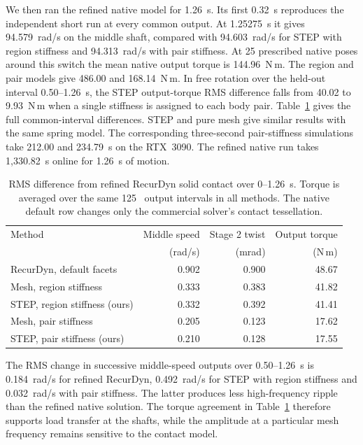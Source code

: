 We then ran the refined native model for 1.26~s. Its first 0.32~s reproduces the independent short run at every common output. At 1.25275~s it gives 94.579~rad/s on the middle shaft, compared with 94.603~rad/s for STEP with region stiffness and 94.313~rad/s with pair stiffness. At 25 prescribed native poses around this switch the mean native output torque is 144.96~N\,m. The region and pair models give 486.00 and 168.14~N\,m. In free rotation over the held-out interval 0.50--1.26~s, the STEP output-torque RMS difference falls from 40.02 to 9.93~N\,m when a single stiffness is assigned to each body pair. Table~\ref{tab:refined-reducer} gives the full common-interval differences. STEP and pure mesh give similar results with the same spring model. The corresponding three-second pair-stiffness simulations take 212.00 and 234.79~s on the RTX~3090. The refined native run takes 1,330.82~s online for 1.26~s of motion.

\begin{table}[pos=!htbp]\small\centering
\caption{RMS difference from refined RecurDyn solid contact over 0--1.26~s. Torque is averaged over the same 125~\microsec{} output intervals in all methods. The native default row changes only the commercial solver's contact tessellation.}
\label{tab:refined-reducer}
\begin{tabular}{lrrr}\toprule
Method & Middle speed & Stage 2 twist & Output torque\\
 & (rad/s) & (mrad) & (N\,m)\\\midrule
RecurDyn, default facets & 0.902 & 0.900 & 48.67\\
Mesh, region stiffness & 0.333 & 0.383 & 41.82\\
STEP, region stiffness (ours) & 0.332 & 0.392 & 41.41\\
Mesh, pair stiffness & 0.205 & 0.123 & 17.62\\
STEP, pair stiffness (ours) & 0.210 & 0.128 & 17.55\\
\bottomrule\end{tabular}\end{table}

The RMS change in successive middle-speed outputs over 0.50--1.26~s is 0.184~rad/s for refined RecurDyn, 0.492~rad/s for STEP with region stiffness and 0.032~rad/s with pair stiffness. The latter produces less high-frequency ripple than the refined native solution. The torque agreement in Table~\ref{tab:refined-reducer} therefore supports load transfer at the shafts, while the amplitude at a particular mesh frequency remains sensitive to the contact model.

